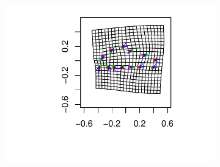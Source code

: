 \documentclass{beamer}\usepackage{graphicx, color}
\begin{document}
\begin{frame}
\begin{figure}[h]
\begin{subfigure}[h]{0.3\textwidth}
  \end{subfigure}
  \begin{subfigure}[h]{0.3\textwidth}
    \centering
    \includegraphics[width = \textwidth]{figure/tps1}    
  \end{subfigure}
  \hspace*{\fill}
\end{figure}

\end{frame}
\end{document}
